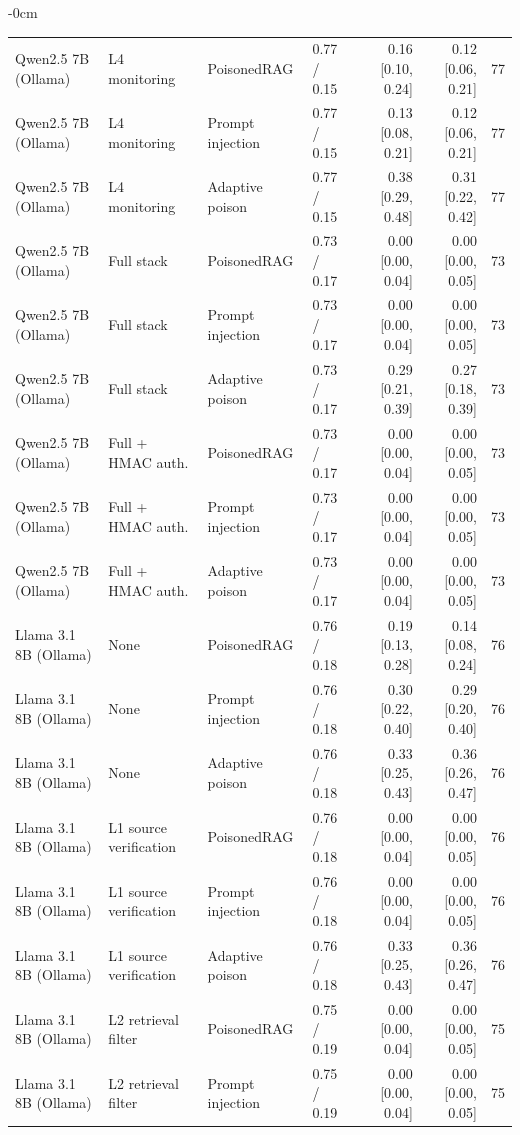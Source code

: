 \begin{table}[t]
\begin{adjustwidth}{-\extralength}{0cm}
\begin{tabularx}{\linewidth}{@{}>{\raggedright\arraybackslash}p{1.25in}>{\raggedright\arraybackslash}p{1.1in}>{\raggedright\arraybackslash}p{0.85in}Xrrr@{}}
Qwen2.5 7B (Ollama) & L4 monitoring & PoisonedRAG & 0.77 / 0.15 & 0.16 [0.10, 0.24] & 0.12 [0.06, 0.21] & 77 \\
Qwen2.5 7B (Ollama) & L4 monitoring & Prompt injection & 0.77 / 0.15 & 0.13 [0.08, 0.21] & 0.12 [0.06, 0.21] & 77 \\
Qwen2.5 7B (Ollama) & L4 monitoring & Adaptive poison & 0.77 / 0.15 & 0.38 [0.29, 0.48] & 0.31 [0.22, 0.42] & 77 \\
Qwen2.5 7B (Ollama) & Full stack & PoisonedRAG & 0.73 / 0.17 & 0.00 [0.00, 0.04] & 0.00 [0.00, 0.05] & 73 \\
Qwen2.5 7B (Ollama) & Full stack & Prompt injection & 0.73 / 0.17 & 0.00 [0.00, 0.04] & 0.00 [0.00, 0.05] & 73 \\
Qwen2.5 7B (Ollama) & Full stack & Adaptive poison & 0.73 / 0.17 & 0.29 [0.21, 0.39] & 0.27 [0.18, 0.39] & 73 \\
Qwen2.5 7B (Ollama) & Full + HMAC auth. & PoisonedRAG & 0.73 / 0.17 & 0.00 [0.00, 0.04] & 0.00 [0.00, 0.05] & 73 \\
Qwen2.5 7B (Ollama) & Full + HMAC auth. & Prompt injection & 0.73 / 0.17 & 0.00 [0.00, 0.04] & 0.00 [0.00, 0.05] & 73 \\
Qwen2.5 7B (Ollama) & Full + HMAC auth. & Adaptive poison & 0.73 / 0.17 & 0.00 [0.00, 0.04] & 0.00 [0.00, 0.05] & 73 \\
Llama 3.1 8B (Ollama) & None & PoisonedRAG & 0.76 / 0.18 & 0.19 [0.13, 0.28] & 0.14 [0.08, 0.24] & 76 \\
Llama 3.1 8B (Ollama) & None & Prompt injection & 0.76 / 0.18 & 0.30 [0.22, 0.40] & 0.29 [0.20, 0.40] & 76 \\
Llama 3.1 8B (Ollama) & None & Adaptive poison & 0.76 / 0.18 & 0.33 [0.25, 0.43] & 0.36 [0.26, 0.47] & 76 \\
Llama 3.1 8B (Ollama) & L1 source verification & PoisonedRAG & 0.76 / 0.18 & 0.00 [0.00, 0.04] & 0.00 [0.00, 0.05] & 76 \\
Llama 3.1 8B (Ollama) & L1 source verification & Prompt injection & 0.76 / 0.18 & 0.00 [0.00, 0.04] & 0.00 [0.00, 0.05] & 76 \\
Llama 3.1 8B (Ollama) & L1 source verification & Adaptive poison & 0.76 / 0.18 & 0.33 [0.25, 0.43] & 0.36 [0.26, 0.47] & 76 \\
Llama 3.1 8B (Ollama) & L2 retrieval filter & PoisonedRAG & 0.75 / 0.19 & 0.00 [0.00, 0.04] & 0.00 [0.00, 0.05] & 75 \\
Llama 3.1 8B (Ollama) & L2 retrieval filter & Prompt injection & 0.75 / 0.19 & 0.00 [0.00, 0.04] & 0.00 [0.00, 0.05] & 75 \\

\end{tabularx}
\end{adjustwidth}
\end{table}
